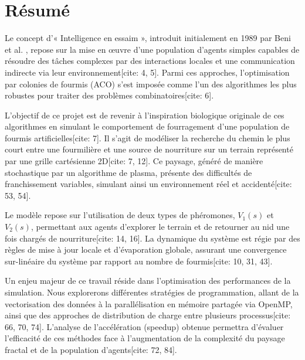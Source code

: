 

\section{Résumé}
Le concept d'« Intelligence en essaim », introduit initialement en 1989 par Beni et al. , repose sur la mise en œuvre d'une population d'agents simples capables de résoudre des tâches complexes par des interactions locales et une communication indirecte via leur environnement[cite: 4, 5]. Parmi ces approches, l'optimisation par colonies de fourmis (ACO) s'est imposée comme l'un des algorithmes les plus robustes pour traiter des problèmes combinatoires[cite: 6].

L'objectif de ce projet est de revenir à l'inspiration biologique originale de ces algorithmes en simulant le comportement de fourragement d'une population de fourmis artificielles[cite: 7]. Il s'agit de modéliser la recherche du chemin le plus court entre une fourmilière et une source de nourriture sur un terrain représenté par une grille cartésienne 2D[cite: 7, 12]. Ce paysage, généré de manière stochastique par un algorithme de plasma, présente des difficultés de franchissement variables, simulant ainsi un environnement réel et accidenté[cite: 53, 54].

Le modèle repose sur l'utilisation de deux types de phéromones, $V_{1}(s)$ et $V_{2}(s)$, permettant aux agents d'explorer le terrain et de retourner au nid une fois chargés de nourriture[cite: 14, 16]. La dynamique du système est régie par des règles de mise à jour locale et d'évaporation globale, assurant une convergence sur-linéaire du système par rapport au nombre de fourmis[cite: 10, 31, 43].

Un enjeu majeur de ce travail réside dans l'optimisation des performances de la simulation. Nous explorerons différentes stratégies de programmation, allant de la vectorisation des données à la parallélisation en mémoire partagée via OpenMP, ainsi que des approches de distribution de charge entre plusieurs processus[cite: 66, 70, 74]. L'analyse de l'accélération (speedup) obtenue permettra d'évaluer l'efficacité de ces méthodes face à l'augmentation de la complexité du paysage fractal et de la population d'agents[cite: 72, 84].
